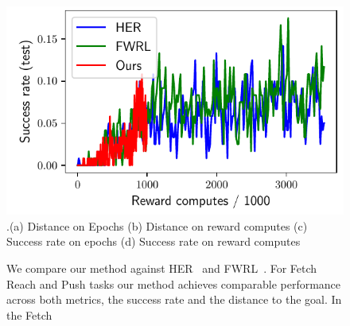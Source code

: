\begin{figure}
  \includegraphics[width=\frac\columnwidth]{media/res/6efc1de-path_reward_low_thresh_chosen-FetchSlidePR-v1-dqst/reward_computes-test/success_rate.pdf}\\
  {.\tiny\color{blue}\hspace{0.8cm}(a) Distance on Epochs \hspace{1.05cm}(b) Distance on
    reward computes
    \hspace{0.70cm} (c) Success rate on epochs \hspace{0.9cm} (d) Success rate on reward computes}
  \label{fig:path-reward-fetch}%
  \caption{ We compare our method against HER~\citep{andrychowicz2016learning}
    and FWRL~\citep{dhiman2018floydwarshall}.
For Fetch Reach and Push tasks our method achieves comparable performance
across both metrics, the success rate and the distance to the goal. In the Fetch
  }%
\end{figure}
